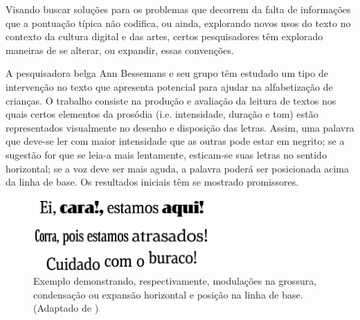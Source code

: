 \documentclass[a4paper,11pt,titlepage,singlespacing]{article}
\begin{document}
Visando buscar soluções para os problemas que decorrem da falta de informações que a pontuação típica não codifica, ou ainda, explorando novos usos do texto no contexto da cultura digital e das artes, certos pesquisadores têm explorado maneiras de se alterar, ou expandir, essas convenções.



    
    A pesquisadora belga Ann Bessemans e seu grupo têm estudado um tipo de intervenção no texto que apresenta potencial para ajudar na alfabetização de crianças. O trabalho consiste na produção e avaliação da leitura de textos nos quais certos elementos da prosódia (i.e. intensidade, duração e tom) estão representados visualmente no desenho e disposição das letras. Assim, uma palavra que deve-se ler com maior intensidade que as outras pode estar em negrito; se a sugestão for que se leia-a mais lentamente, esticam-se suas letras no sentido horizontal; se a voz deve ser mais aguda, a palavra poderá ser posicionada acima da linha de base. Os resultados iniciais têm se mostrado promissores\cite{bessemans2017}. 
    
    \begin{figure}[!ht]
    
    \centering
    \label{fig:exemplo}
    \captionsetup{width=\textwidth}
        \includegraphics[width=0.6\textwidth]{fig/exemplos_tipo_bessemans.png}
        
    \caption{Exemplo demonstrando, respectivamente, modulações na grossura, condensação ou expansão horizontal e posição na linha de base. (Adaptado de )}
\end{figure}
    
\end{document}
